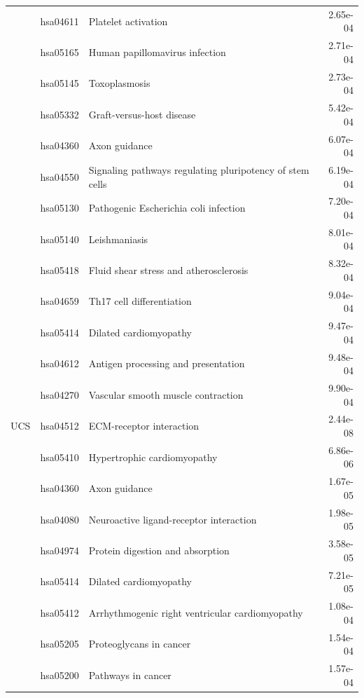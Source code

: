 \begin{longtable}{cllr}
 & hsa04611 & \textcolor{\clrnew}{Platelet activation} & 2.65e-04 \\ 
 & hsa05165 & \textcolor{\clrnew}{Human papillomavirus infection} & 2.71e-04 \\ 
 & hsa05145 & \textcolor{\clrnew}{Toxoplasmosis} & 2.73e-04 \\ 
 & hsa05332 & \textcolor{\clrnew}{Graft-versus-host disease} & 5.42e-04 \\ 
 & hsa04360 & \textcolor{\clrnew}{Axon guidance} & 6.07e-04 \\ 
 & hsa04550 & \textcolor{\clrnew}{Signaling pathways regulating pluripotency of stem cells} & 6.19e-04 \\ 
 & hsa05130 & \textcolor{\clrnew}{Pathogenic Escherichia coli infection} & 7.20e-04 \\ 
 & hsa05140 & \textcolor{\clrnew}{Leishmaniasis} & 8.01e-04 \\ 
 & hsa05418 & \textcolor{\clrnew}{Fluid shear stress and atherosclerosis} & 8.32e-04 \\ 
 & hsa04659 & \textcolor{\clrnew}{Th17 cell differentiation} & 9.04e-04 \\ 
 & hsa05414 & \textcolor{\clrnew}{Dilated cardiomyopathy} & 9.47e-04 \\ 
 & hsa04612 & \textcolor{\clrnew}{Antigen processing and presentation} & 9.48e-04 \\ 
 & hsa04270 & \textcolor{\clrnew}{Vascular smooth muscle contraction} & 9.90e-04 \\ 
\midrule 
\rowcolor{\clrmatch}UCS & hsa04512 & ECM-receptor interaction & 2.44e-08\\ 
 & hsa05410 & \textcolor{\clrnew}{Hypertrophic cardiomyopathy} & 6.86e-06 \\ 
 & hsa04360 & \textcolor{\clrnew}{Axon guidance} & 1.67e-05 \\ 
 & hsa04080 & \textcolor{\clrnew}{Neuroactive ligand-receptor interaction} & 1.98e-05 \\ 
 \rowcolor{\clrmatch}& hsa04974 & Protein digestion and absorption & 3.58e-05 \\ 
 & hsa05414 & \textcolor{\clrnew}{Dilated cardiomyopathy} & 7.21e-05 \\ 
 & hsa05412 & \textcolor{\clrnew}{Arrhythmogenic right ventricular cardiomyopathy} & 1.08e-04 \\ 
 & hsa05205 & \textcolor{\clrnew}{Proteoglycans in cancer} & 1.54e-04 \\ 
 & hsa05200 & \textcolor{\clrnew}{Pathways in cancer} & 1.57e-04 \\ 

\end{longtable}
